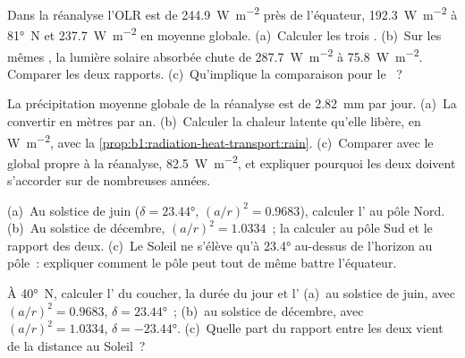 \begin{exercise}[$\star$]\label{exo:b1:radiation-heat-transport:3}
Dans la réanalyse l'OLR est de \qty{244.9}{W.m^{-2}} près de l'équateur,
\qty{192.3}{W.m^{-2}} à \ang{81}~N et \qty{237.7}{W.m^{-2}} en moyenne globale.
(a)~Calculer les trois . (b)~Sur les mêmes , la
lumière solaire absorbée chute de \qty{287.7}{W.m^{-2}} à \qty{75.8}{W.m^{-2}}. Comparer
les deux rapports. (c)~Qu'implique la comparaison pour le ~?
\end{exercise}

\begin{exercise}[$\star$]\label{exo:b1:radiation-heat-transport:4}
La précipitation moyenne globale de la réanalyse est de \qty{2.82}{mm} par jour. (a)~La convertir en
mètres par an. (b)~Calculer la chaleur latente qu'elle libère, en \unit{W.m^{-2}}, avec
la \cref{prop:b1:radiation-heat-transport:rain}. (c)~Comparer avec le 
global propre à la réanalyse, \qty{82.5}{W.m^{-2}}, et expliquer pourquoi les deux doivent s'accorder
sur de nombreuses années.
\end{exercise}

\begin{exercise}[$\star\star$]\label{exo:b1:radiation-heat-transport:5}
(a)~Au solstice de juin ($\delta = \ang{23.44}$, $(a/r)^2 = 0.9683$), calculer
l' au pôle Nord. (b)~Au solstice de décembre, $(a/r)^2 =
1.0334$~; la calculer au pôle Sud et le rapport des deux. (c)~Le Soleil ne s'élève
qu'à \ang{23.4} au-dessus de l'horizon au pôle~: expliquer comment le pôle peut tout de même battre
l'équateur.
\end{exercise}

\begin{exercise}[$\star\star$]\label{exo:b1:radiation-heat-transport:6}
À \ang{40}~N, calculer l' du coucher, la durée du jour et
l' (a)~au solstice de juin, avec $(a/r)^2 = 0.9683$, $\delta =
\ang{23.44}$~; (b)~au solstice de décembre, avec $(a/r)^2 = 1.0334$, $\delta =
\ang{-23.44}$. (c)~Quelle part du rapport entre les deux vient de la distance
au Soleil~?
\end{exercise}

